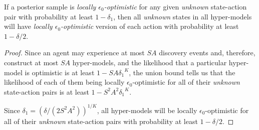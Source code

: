 \begin{lemma}
\label{sec:boss:lemma:opt}
If a posterior sample is \emph{locally $\epsilon_0$-optimistic} for any given \emph{unknown} state-action pair with probability at least $1-\delta_1$, then all \emph{unknown} states in all hyper-models will have \emph{locally $\epsilon_0$-optimistic} version of each action with probability at least $1-\delta/2$.
\end{lemma}
\begin{proof}
Since an agent may experience at most $S A$ discovery events and, therefore, construct at most $S A$ hyper-models, and the likelihood that a particular hyper-model is optimistic is at least $1-SA{\delta_1}^K$, the union bound tells us that the likelihood of each of them being {locally $\epsilon_0$-optimistic} for all of their \emph{unknown} state-action pairs is at least $1-S^2A^2{\delta_1}^K$.

Since $\delta_1 = \left(\delta/(2S^2A^2)\right)^{1/K}$, all hyper-models will be {locally $\epsilon_0$-optimistic} for all of their \emph{unknown} state-action pairs with probability at least $1-\delta/2$.
\end{proof}


